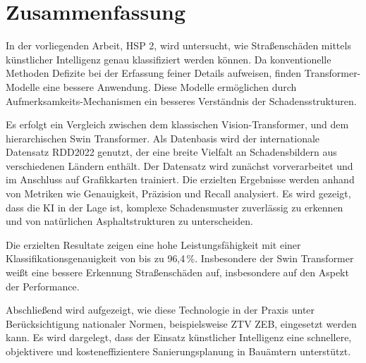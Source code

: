 \thispagestyle{empty}
\section*{Zusammenfassung}
In der vorliegenden Arbeit, HSP 2, wird untersucht, wie Straßenschäden mittels künstlicher Intelligenz genau klassifiziert werden können. Da konventionelle Methoden Defizite bei der Erfassung feiner Details aufweisen, finden Transformer-Modelle eine bessere Anwendung. Diese Modelle ermöglichen durch Aufmerksamkeits-Mechanismen ein besseres Verständnis der Schadensstrukturen.

Es erfolgt ein Vergleich zwischen dem klassischen Vision-Transformer, und dem hierarchischen Swin Transformer. Als Datenbasis wird der internationale Datensatz RDD2022 genutzt, der eine breite Vielfalt an Schadensbildern aus verschiedenen Ländern enthält. Der Datensatz wird zunächst vorverarbeitet und im Anschluss auf Grafikkarten trainiert. Die erzielten Ergebnisse werden anhand von Metriken wie Genauigkeit, Präzision und Recall analysiert. Es wird gezeigt, dass die KI in der Lage ist, komplexe Schadensmuster zuverlässig zu erkennen und von natürlichen Asphaltstrukturen zu unterscheiden. 

Die erzielten Resultate zeigen eine hohe Leistungsfähigkeit mit einer Klassifikationsgenauigkeit von bis zu 96,4\,\%. Insbesondere der Swin Transformer weißt eine bessere Erkennung Straßenschäden auf, insbesondere auf den Aspekt der Performance.

Abschließend wird aufgezeigt, wie diese Technologie in der Praxis unter Berücksichtigung nationaler Normen, beispielsweise ZTV ZEB, eingesetzt werden kann. Es wird dargelegt, dass der Einsatz künstlicher Intelligenz eine schnellere, objektivere und kosteneffizientere Sanierungsplanung in Bauämtern unterstützt.
\newpage
